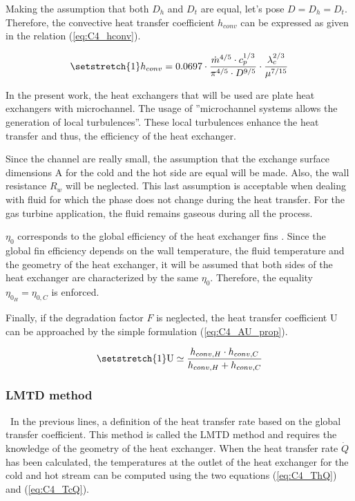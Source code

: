 Making the assumption that both \(D_h\) and \(D_t\) are equal, let's pose \(D=D_h=D_t\). Therefore, the convective heat transfer coefficient \(h_{conv}\) can be expressed as given in the relation (\ref{eq:C4_hconv}).


\begin{equation}
    \setstretch{1}
    h_{conv} = 0.0697\cdot \frac{\dot{m}^{4/5}\cdot c_p^{1/3}}{\pi^{4/5}\cdot D^{9/5}}\cdot \frac{\lambda_c^{2/3}}{\mu^{7/15}} \label{eq:C4_hconv}
\end{equation}

In the present work, the heat exchangers that will be used are plate heat exchangers with microchannel. The usage of ''microchannel systems allows the generation of local turbulences''\cite{Joseph2020}. These local turbulences enhance the heat transfer and thus, the efficiency of the heat exchanger.

Since the channel are really small, the assumption that the exchange surface dimensions \(\mathrm{A}\) for the cold and the hot side are equal will be made. Also, the wall resistance \(R_w\) will be neglected. This last assumption is acceptable when dealing with fluid for which the phase does not change during the heat transfer. For the gas turbine application, the fluid remains gaseous during all the process. 

\(\eta_0\) corresponds to the global efficiency of the heat exchanger fins \cite{GregoryNellis2015}. Since the global fin efficiency depends on the wall temperature, the fluid temperature and the geometry of the heat exchanger, it will be assumed that both sides of the heat exchanger are characterized by the same $\eta_0$. Therefore, the equality $\eta_{0_H}=\eta_{0,C}$ is enforced.

Finally, if the degradation factor $F$ is neglected, the heat transfer coefficient \(\mathrm{U}\) can be approached by the simple formulation (\ref{eq:C4_AU_prop}).


 \begin{equation}
    \setstretch{1}
    \mathrm{U} \simeq \frac{h_{conv,H}\cdot h_{conv,C}}{h_{conv,H} + h_{conv,C}}\label{eq:C4_AU_prop}
\end{equation}
\subsubsection{LMTD method}
\quad\ In the previous lines, a definition of the heat transfer rate based on the global transfer coefficient. This method is called the LMTD method and requires the knowledge of the geometry of the heat exchanger.
When the heat transfer rate \(\dot{Q}\) has been calculated, the temperatures at the outlet of the heat exchanger for the cold and hot stream can be computed using the two equations (\ref{eq:C4_ThQ}) and (\ref{eq:C4_TcQ}).

